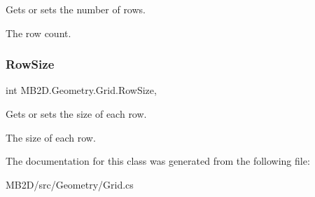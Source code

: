 Gets or sets the number of rows. 

The row count.\hypertarget{class_m_b2_d_1_1_geometry_1_1_grid_a38536c42bc3d3d5e58d648fd7b7f8e17}{}\label{class_m_b2_d_1_1_geometry_1_1_grid_a38536c42bc3d3d5e58d648fd7b7f8e17} 
\subsubsection{\texorpdfstring{Row\+Size}{RowSize}}
{\footnotesize\ttfamily int M\+B2\+D.\+Geometry.\+Grid.\+Row\+Size\hspace{0.3cm}{\ttfamily [get]}, {\ttfamily [set]}}



Gets or sets the size of each row. 

The size of each row.

The documentation for this class was generated from the following file\+:\begin{DoxyCompactItemize}
\item 
M\+B2\+D/src/\+Geometry/Grid.\+cs\end{DoxyCompactItemize}
